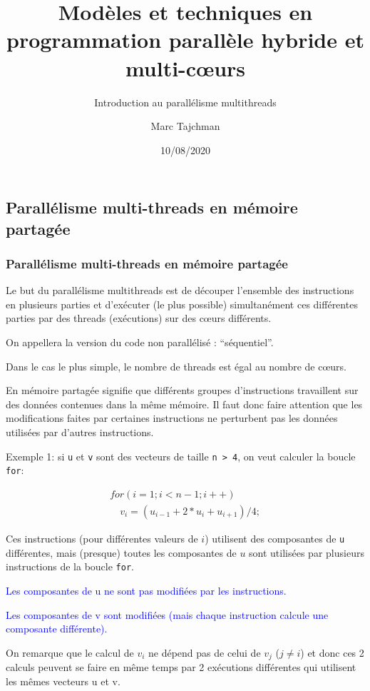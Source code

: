 \documentclass{beamer}
\title{Modèles et techniques en programmation parallèle hybride et multi-c\oe urs}
\subtitle{Introduction au parall\'elisme multithreads}
\author{Marc Tajchman}\institute{CEA - DEN/DM2S/STMF/LMES}
\date{10/08/2020}
\begin{document}
\begin{frame}
	\titlepage
\end{frame}

\large
\begin{frame}
	\section{Parallélisme multi-threads en mémoire partagée}
	\frametitle{Parallélisme multi-threads en mémoire partagée}
	
	\vfill
	Le but du parallélisme multithreads est de découper l'ensemble des instructions en plusieurs parties et d'exécuter (le plus possible) simultanément ces différentes parties par des threads (exécutions) sur des c\oe urs différents.
	
	
	\vfill
	On appellera la version du code non parallélisé : ``séquentiel''.
	
	\vfill
    Dans le cas le plus simple, le nombre de threads est égal au nombre de c\oe urs.

	\vfill
	En mémoire partagée signifie que différents groupes d'instructions travaillent sur des données contenues dans la même mémoire. Il faut donc faire attention que les modifications faites par certaines instructions ne perturbent pas les données utilisées par d'autres instructions.
	\vfill
	
\end{frame}

\large
\begin{frame}[fragile]
	Exemple 1: si \verb|u| et \verb|v| sont des vecteurs de taille \verb|n > 4|, on veut calculer la boucle {\tt for}:
	
	\begin{equation}
	\begin{array}{l}
for (i=1; i<n-1; i++) \\
\quad  v_i = (u_{i-1} + 2*u_{i} + u_{i+1})/4;
\end{array}
	\end{equation}
	
	\vfill
	Ces instructions (pour différentes valeurs de $i$) utilisent des composantes de \verb|u| différentes, mais (presque) toutes les composantes de $u$ sont utilisées par plusieurs instructions de la boucle {\tt for}.
	
	\vfill
	\textcolor{blue}{Les composantes de u ne sont pas modifiées par les instructions.}
	
	\vfill
	\textcolor{blue}{Les composantes de v sont modifiées (mais chaque instruction calcule une composante différente).}
	
	\vfill
	On remarque que le calcul de $v_i$ ne dépend pas de celui de $v_j$ ($j \neq i$) et donc ces 2 calculs peuvent se faire en même temps par 2 ex\'ecutions différentes qui utilisent les mêmes vecteurs u et v.
		
\end{frame}
\end{document}
